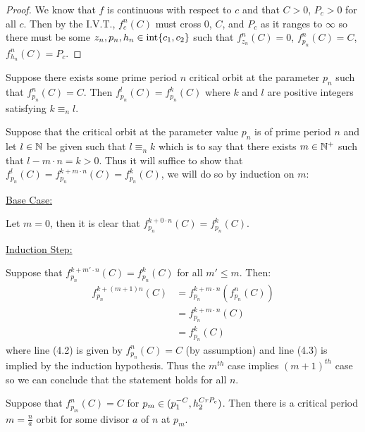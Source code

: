 		\begin{proof}
			We know that $f$ is continuous with respect to $c$ and that $C>0$, $P_c>0$ for all $c$. Then by the I.V.T., $f_c^n (C)$ must cross $0$, $C$, and $P_c$ as it ranges to $\infty$ so there must be some $z_n,p_n,h_n \in \text{int}\{c_1,c_2\}$ such that $f^n_{z_n} (C) = 0$, $f^n_{p_n} (C) = C$, $f^n_{h_n} (C) = P_c$.
		\end{proof}

		\begin{mylemma} \label{one}
		Suppose there exists some prime period $n$ critical orbit at the parameter $p_n$ such that $f^n_{p_n} (C)= C$. Then $f^{l}_{p_n} (C) = f^{k}_{p_n} (C)$ where $k$ and $l$ are positive integers satisfying $k \equiv_n l$.
		\end{mylemma}

		\begin{myproof}
			Suppose that the critical orbit at the parameter value $p_n$ is of prime period $n$ and let $l \in \mathbb{N}$ be given such that $l \equiv_n k$ which is to say that there exists $m \in \mathbb{N}^+$ such that $l - m \cdot n = k > 0$. Thus it will suffice to show that $f^{l}_{p_n} (C) = f^{k + m \cdot n}_{p_n} (C) = f^{k}_{p_n} (C)$, we will do so by induction on $m$:

			\underline{Base Case:}

			Let $m = 0$, then it is clear that $f_{p_n}^{k + 0\cdot n} (C) = f^k_{p_n} (C)$.

			\underline{Induction Step:}

			Suppose that $f^{k + m' \cdot n}_{p_n} (C) = f^{k}_{p_n} (C)$ for all $m' \leq m$. Then:
			\begin{align}
			f^{k + (m + 1)n}_{p_n} (C) 	&= f^{k + m \cdot n}_{p_n} (f^n_{p_n} (C))\\
									&= f^{k + m \cdot n}_{p_n} (C)\\
									&= f^k_{p_n} (C)
			\end{align}
			where line (4.2) is given by $f^n_{p_n} (C) = C$ (by assumption) and line (4.3) is implied by the induction hypothesis. Thus the $m^{th}$ case implies $ (m + 1)^{th}$ case so we can conclude that the statement holds for all $n$.
		\end{myproof}

		\begin{mylemma} \label{two}
		Suppose that $f^n_{p_m} (C)= C$ for $p_m \in (p^{-C}_1, h^{CrP_c}_2)$. Then there is a critical period $m = \frac{n}{a}$ orbit for some divisor $a$ of $n$ at $p_m$.
		\end{mylemma}

